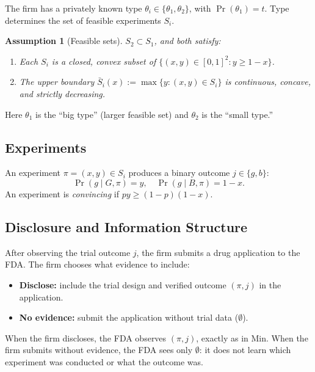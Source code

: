 \documentclass[12pt,a4paper]{article}
\newtheorem{assumption}{Assumption}
\begin{document}
The firm has a privately known type
$\theta_i \in \{\theta_1, \theta_2\}$, with
$\Pr(\theta_1) = t$. Type determines the set of feasible
experiments $S_i$.

\begin{assumption}[Feasible sets]\label{as:feasible}
$S_2 \subset S_1$, and both satisfy:
\begin{enumerate}
  \item[(i)] Each $S_i$ is a closed, convex subset of
    $\{(x, y) \in [0,1]^2 : y \geq 1 - x\}$.
  \item[(ii)] The upper boundary
    $\bar{S}_i(x) := \max\{y : (x,y) \in S_i\}$ is
    continuous, concave, and strictly decreasing.
\end{enumerate}
\end{assumption}

Here $\theta_1$ is the ``big type'' (larger feasible set)
and $\theta_2$ is the ``small type.''


\subsection{Experiments}

An experiment $\pi = (x, y) \in S_i$ produces a binary outcome
$j \in \{g, b\}$:
\[
  \Pr(g \mid G, \pi) = y, \quad
  \Pr(g \mid B, \pi) = 1 - x.
\]
An experiment is \emph{convincing} if
$py \geq (1 - p)(1 - x)$.


\subsection{Disclosure and Information Structure}
\label{sec:modification}

After observing the trial outcome $j$, the firm submits a
drug application to the FDA. The firm chooses what evidence to
include:
\begin{itemize}
  \item \textbf{Disclose:} include the trial design and
    verified outcome $(\pi, j)$ in the application.
  \item \textbf{No evidence:} submit the application without
    trial data ($\emptyset$).
\end{itemize}

When the firm discloses, the FDA observes $(\pi, j)$, exactly
as in Min. When the firm submits without evidence, the FDA
sees only $\emptyset$: it does not learn which experiment was
conducted or what the outcome was.
\end{document}
